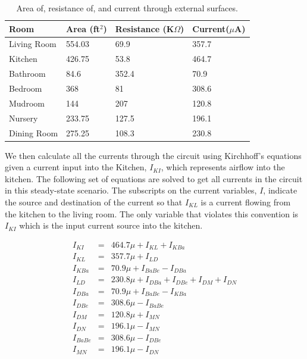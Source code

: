 \begin{table}[!htb]
{
  \begin{tabular}{|l|l|l|l|} \hline
    Room & Area (ft$^2$) & Resistance (K$\Omega$) & Current($\mu$A) \\ \hline\hline
    Living Room & 554.03 & 69.9 & 357.7
    \\ \hline 
    Kitchen & 426.75 & 53.8 &464.7
    \\ \hline
    Bathroom & 84.6 & 352.4 & 70.9
    \\ \hline
    Bedroom & 368 & 81 & 308.6
    \\ \hline
    Mudroom & 144 & 207 & 120.8
    \\ \hline
    Nursery & 233.75 & 127.5 & 196.1
    \\ \hline
    Dining Room & 275.25 & 108.3 & 230.8
    \\ \hline
    \end{tabular}}
\caption{Area of, resistance of, and current through external surfaces.}
\label{table:extSurface}
\end{table}

We then calculate all the currents through the circuit using Kirchhoff's
equations given a current input into the Kitchen, $I_{KI}$, which represents
airflow into the kitchen. The following set of equations are solved to get all
currents in the circuit in this steady-state scenario. The subscripts on the
current variables, $I$, indicate the source and destination of the current so
that $I_{KL}$ is a current flowing from the kitchen to the living room. The only
variable that violates this convention is $I_{KI}$ which is the input current
source into the kitchen. 

\begin{eqnarray}
I_{KI} &=& 464.7\mu + I_{KL} + I_{KBa} \\ 
I_{KL} &=& 357.7\mu + I_{LD} \\
I_{KBa} &=& 70.9\mu + I_{BaBe} - I_{DBa} \\
I_{LD} &=& 230.8\mu + I_{DBa} + I_{DBe} + I_{DM} + I_{DN} \\
I_{DBa} &=& 70.9\mu + I_{BaBe} - I_{KBa} \\
I_{DBe} &=& 308.6\mu - I_{BaBe} \\
I_{DM} &=& 120.8\mu + I_{MN} \\
I_{DN} &=& 196.1\mu - I_{MN} \\
I_{BaBe} &=& 308.6\mu - I_{DBe} \\
I_{MN} &=& 196.1\mu - I_{DN}
\end{eqnarray}

